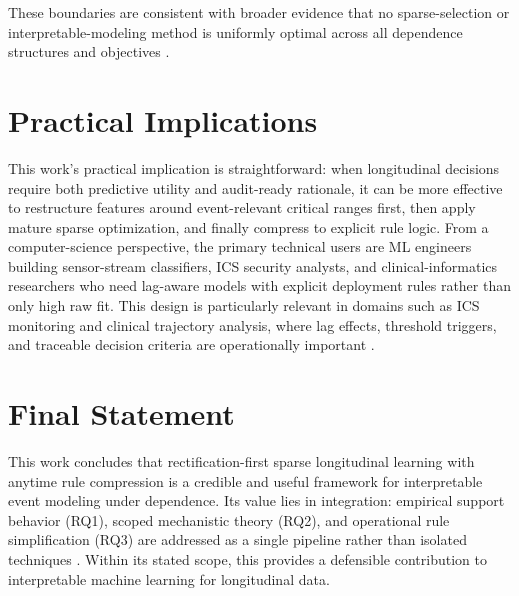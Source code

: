 These boundaries are consistent with broader evidence that no sparse-selection or interpretable-modeling method is uniformly optimal across all dependence structures and objectives \autocite{freijeirogonzalez2022,WJMurdoch2019Definitions}.

\section{Practical Implications}

This work's practical implication is straightforward: when longitudinal decisions require both predictive utility and audit-ready rationale, it can be more effective to restructure features around event-relevant critical ranges first, then apply mature sparse optimization, and finally compress to explicit rule logic. From a computer-science perspective, the primary technical users are ML engineers building sensor-stream classifiers, ICS security analysts, and clinical-informatics researchers who need lag-aware models with explicit deployment rules rather than only high raw fit. This design is particularly relevant in domains such as ICS monitoring and clinical trajectory analysis, where lag effects, threshold triggers, and traceable decision criteria are operationally important \autocite{shin2020,wong2010longitudinal,hiploylee2017}.

\section{Final Statement}

This work concludes that rectification-first sparse longitudinal learning with anytime rule compression is a credible and useful framework for interpretable event modeling under dependence. Its value lies in integration: empirical support behavior (RQ1), scoped mechanistic theory (RQ2), and operational rule simplification (RQ3) are addressed as a single pipeline rather than isolated techniques \autocite{orender2022,JOrender2025Efficient,JOrender2025Anytime}. Within its stated scope, this provides a defensible contribution to interpretable machine learning for longitudinal data.
